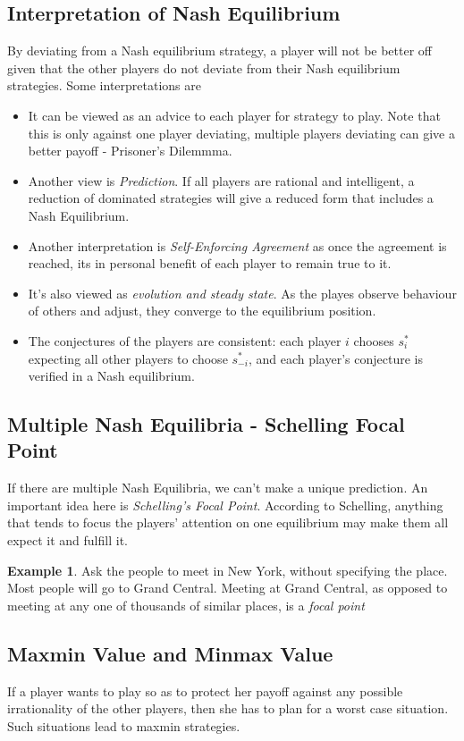 \documentclass{article}
\theoremstyle{definition}
\newtheorem{example}{Example}[section]
\begin{document}
\subsection{Interpretation of Nash Equilibrium}
By deviating from a Nash equilibrium strategy, a player will not be better off given that the other players do not deviate from their Nash equilibrium strategies. Some interpretations are
\begin{itemize}
	\item It can be viewed as an advice to each player for strategy to play. Note that this is only against one player deviating, multiple players deviating can give a better payoff - Prisoner's Dilemmma.
	\item Another view is \textit{Prediction}. If all players are rational and intelligent, a reduction of dominated strategies will give a reduced form that includes a Nash Equilibrium.
	\item Another interpretation is \textit{Self-Enforcing Agreement} as once the agreement is reached, its in personal benefit of each player to remain true to it.
	\item It's also viewed as \textit{evolution and steady state}. As the playes observe behaviour of others and adjust, they converge to the equilibrium position.
	\item The conjectures of the players are consistent: each player $i$ chooses $s_i^*$ expecting all other players to choose $s_{-i}^*$, and each player’s conjecture is verified in a Nash equilibrium.
\end{itemize}
\subsection{Multiple Nash Equilibria - Schelling Focal Point}
If there are multiple Nash Equilibria, we can't make a unique prediction. An important idea here is \textit{Schelling's Focal Point}. According to Schelling, anything that tends to focus the players' attention on one equilibrium may make them all expect it and fulfill it.\\

\begin{example} 
Ask the people to meet in New York, without specifying the place. Most people will go to Grand Central. Meeting at Grand Central, as opposed to meeting at any one of thousands of similar places, is a \textit{focal point}
\end{example}
\subsection{Maxmin Value and Minmax Value}
If a player wants to play so as to protect her payoff against any possible irrationality of the other players, then she has to plan for a worst case situation. Such situations lead to maxmin strategies.
\end{document}
